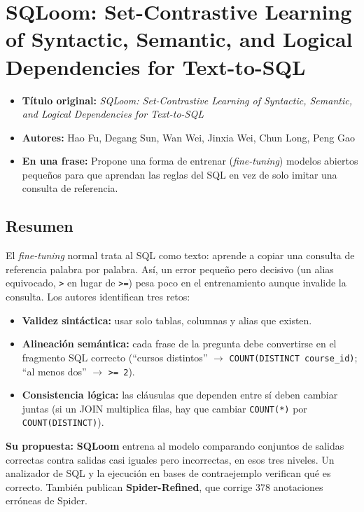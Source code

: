 \documentclass[11pt,a4paper]{article}
\newcommand{\ficha}[5]{%
  \begin{itemize}[leftmargin=*, label={}]
    \item \textbf{Título original:} \textit{#1}
    \item \textbf{Autores:} #2
    \item \textbf{En una frase:} #5
  \end{itemize}
}
\begin{document}
\section{SQLoom: Set-Contrastive Learning of Syntactic, Semantic, and Logical Dependencies for Text-to-SQL}
\ficha
  {SQLoom: Set-Contrastive Learning of Syntactic, Semantic, and Logical Dependencies for Text-to-SQL}
  {Hao Fu, Degang Sun, Wan Wei, Jinxia Wei, Chun Long, Peng Gao}
  {Virginia Tech y Computer Network Information Center, Chinese Academy of Sciences}
  {arXiv:2611.03298v1 (preprint), noviembre 2026; WWW '27}
  {Propone una forma de entrenar (\textit{fine-tuning}) modelos abiertos pequeños para que aprendan las reglas del SQL en vez de solo imitar una consulta de referencia.}

\subsection*{Resumen}
El \textit{fine-tuning} normal trata al SQL como texto: aprende a copiar una consulta de referencia palabra por palabra. Así, un error pequeño pero decisivo (un alias equivocado, \texttt{>} en lugar de \texttt{>=}) pesa poco en el entrenamiento aunque invalide la consulta. Los autores identifican tres retos:
\begin{itemize}
  \item \textbf{Validez sintáctica:} usar solo tablas, columnas y alias que existen.
  \item \textbf{Alineación semántica:} cada frase de la pregunta debe convertirse en el fragmento SQL correcto (``cursos distintos'' $\rightarrow$ \texttt{COUNT(DISTINCT course\_id)}; ``al menos dos'' $\rightarrow$ \texttt{>= 2}).
  \item \textbf{Consistencia lógica:} las cláusulas que dependen entre sí deben cambiar juntas (si un JOIN multiplica filas, hay que cambiar \texttt{COUNT(*)} por \texttt{COUNT(DISTINCT)}).
\end{itemize}

\textbf{Su propuesta:} \textbf{SQLoom} entrena al modelo comparando conjuntos de salidas correctas contra salidas casi iguales pero incorrectas, en esos tres niveles. Un analizador de SQL y la ejecución en bases de contraejemplo verifican qué es correcto. También publican \textbf{Spider-Refined}, que corrige 378 anotaciones erróneas de Spider.
\end{document}
